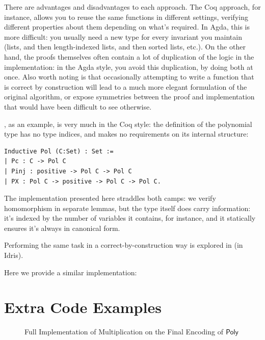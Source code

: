 \documentclass[draft, twocolumn]{article}
\theoremstyle{definition}
\theoremstyle{remark}
\begin{document}
There are advantages and disadvantages to each approach. The Coq approach, for
instance, allows you to reuse the same functions in different settings,
verifying different properties about them depending on what's required. In Agda,
this is more difficult: you usually need a new type for every invariant you
maintain (lists, and then length-indexed lists, and then sorted lists, etc.). On
the other hand, the proofs themselves often contain a lot of duplication of the
logic in the implementation: in the Agda style, you avoid this duplication, by
doing both at once. Also worth noting is that occasionally attempting to write a
function that is correct by construction will lead to a much more elegant
formulation of the original algorithm, or expose symmetries between the proof
and implementation that would have been difficult to see otherwise.

\cite{hutchison_proving_2005}, as an example, is very much in the Coq style: the
definition of the polynomial type has no type indices, and makes no requirements
on its internal structure:
\begin{verbatim}
Inductive Pol (C:Set) : Set :=
| Pc : C -> Pol C
| Pinj : positive -> Pol C -> Pol C
| PX : Pol C -> positive -> Pol C -> Pol C.
\end{verbatim}

The implementation presented here straddles both camps: we verify homomorphism
in separate lemmas, but the type itself does carry information: it's indexed by
the number of variables it contains, for instance, and it statically ensures
it's always in canonical form.

Performing the same task in a correct-by-construction way is explored
in\cite{geuvers_automatically_2017} (in Idris\cite{brady_idris_2013}).

Here we provide a similar implementation:


\appendix
\section{Extra Code Examples}
\begin{figure}
  \caption{Full Implementation of Multiplication on the Final Encoding of
    \(\AgdaDatatype{Poly}\)}
  \label{full-mul}
\end{figure}
\end{document}
